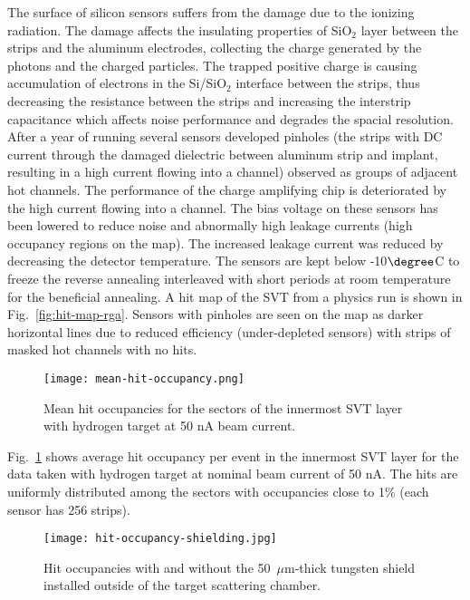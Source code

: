 The surface of silicon sensors suffers from the damage due to the ionizing radiation. The damage affects the insulating properties of SiO$_2$ layer between the strips and the aluminum electrodes, collecting the charge generated by the photons and the charged particles. The trapped positive charge is causing accumulation of electrons in the Si/SiO$_2$ interface between the strips, thus decreasing the resistance between the strips and increasing the interstrip capacitance which affects noise performance and degrades the spacial resolution. After a year of running several sensors developed pinholes (the strips with DC current through the damaged dielectric between aluminum strip and implant, resulting in a high current flowing into a channel) observed as groups of adjacent hot channels. The performance of the charge amplifying chip is deteriorated by the high current flowing into a channel. The bias voltage on these sensors has been lowered to reduce noise and abnormally high leakage currents (high occupancy regions on the map). The increased leakage current was reduced by decreasing the detector temperature. The sensors are kept below -10$\degree$C to freeze the reverse annealing interleaved with short periods at room temperature for the beneficial annealing. A hit map of the SVT from a physics run is shown in Fig.~\ref{fig:hit-map-rga}. Sensors with pinholes are seen on the map as darker horizontal lines due to reduced efficiency (under-depleted sensors) with strips of masked hot channels with no hits. 

\begin{figure}[hbt] 
\centering 
\texttt{[image: mean-hit-occupancy.png]}
\caption{Mean hit occupancies for the sectors of the innermost SVT layer with hydrogen target at 50 nA beam current.}
\label{fig:mean-hit-occupancy}
\end{figure}

Fig.~\ref{fig:mean-hit-occupancy} shows average hit occupancy per event in the innermost SVT layer for the data taken with hydrogen target at nominal beam current of 50 nA. The hits are uniformly distributed among the sectors with occupancies close to 1$\%$ (each sensor has 256 strips).

\begin{figure}[hbt] 
\centering 
\texttt{[image: hit-occupancy-shielding.jpg]}
\caption{Hit occupancies with and without the 50~$\mu$m-thick tungsten shield installed outside of the target scattering chamber.}
\label{fig:hit-occupancy-shielding}
\end{figure}

